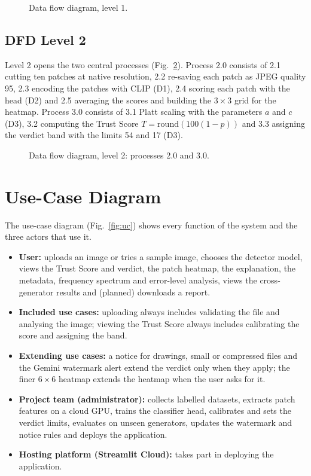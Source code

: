 \begin{figure}[htbp]
  \centering
  
  \caption{Data flow diagram, level 1.}\label{fig:dfd1}
\end{figure}

\subsection{DFD Level 2}
Level 2 opens the two central processes (Fig.~\ref{fig:dfd2}). Process 2.0 consists of 2.1 cutting ten patches at native resolution, 2.2 re-saving each patch as JPEG quality 95, 2.3 encoding the patches with CLIP (D1), 2.4 scoring each patch with the head (D2) and 2.5 averaging the scores and building the $3\times3$ grid for the heatmap. Process 3.0 consists of 3.1 Platt scaling with the parameters $a$ and $c$ (D3), 3.2 computing the Trust Score $T=\mathrm{round}(100(1-p))$ and 3.3 assigning the verdict band with the limits 54 and 17 (D3).

\begin{figure}[htbp]
  \centering
  
  \caption{Data flow diagram, level 2: processes 2.0 and 3.0.}\label{fig:dfd2}
\end{figure}

\section{Use-Case Diagram}
The use-case diagram (Fig.~\ref{fig:uc}) shows every function of the system and the three actors that use it.
\begin{itemize}
  \item \textbf{User:} uploads an image or tries a sample image, chooses the detector model, views the Trust Score and verdict, the patch heatmap, the explanation, the metadata, frequency spectrum and error-level analysis, views the cross-generator results and (planned) downloads a report.
  \item \textbf{Included use cases:} uploading always includes validating the file and analysing the image; viewing the Trust Score always includes calibrating the score and assigning the band.
  \item \textbf{Extending use cases:} a notice for drawings, small or compressed files and the Gemini watermark alert extend the verdict only when they apply; the finer $6\times6$ heatmap extends the heatmap when the user asks for it.
  \item \textbf{Project team (administrator):} collects labelled datasets, extracts patch features on a cloud GPU, trains the classifier head, calibrates and sets the verdict limits, evaluates on unseen generators, updates the watermark and notice rules and deploys the application.
  \item \textbf{Hosting platform (Streamlit Cloud):} takes part in deploying the application.
\end{itemize}

